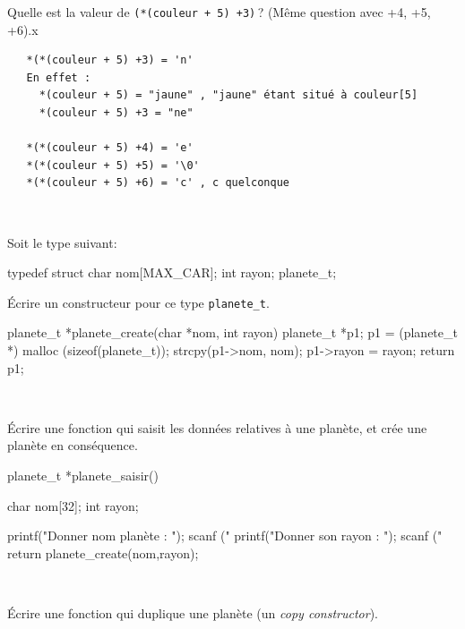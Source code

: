 \documentclass[10pt]{article}\usepackage[nu,correction]{esial}
\begin{document}
\Question Quelle est la valeur de {\tt *(*(couleur + 5) +3)}\,? (Même
question avec +4, +5, +6).x

\begin{Reponse}
\begin{verbatim} 
   *(*(couleur + 5) +3) = 'n' 
   En effet : 
     *(couleur + 5) = "jaune" , "jaune" étant situé à couleur[5] 
     *(couleur + 5) +3 = "ne"

   *(*(couleur + 5) +4) = 'e' 
   *(*(couleur + 5) +5) = '\0' 
   *(*(couleur + 5) +6) = 'c' , c quelconque 
\end{verbatim}
~
\end{Reponse}




\bigskip\bigskip{}

Soit le type suivant:


\medskip

\begin{boxedverbatim}
  typedef struct {
    char nom[MAX_CAR];
    int  rayon;  
  } planete_t;
\end{boxedverbatim}


\Question Écrire un constructeur pour ce type \texttt{planete\_t}.

\begin{Reponse}
  \begin{boxedverbatim} 
planete_t *planete_create(char *nom, int rayon) {
    planete\_t *p1;
    p1 = (planete_t *) malloc (sizeof(planete_t));
    strcpy(p1->nom, nom);
    p1->rayon = rayon;
    return p1;
}  \end{boxedverbatim}
~
\end{Reponse}
	  
\Question Écrire une fonction qui saisit les données relatives à une
planète, et crée une planète en conséquence.

\begin{Reponse}
  \begin{boxedverbatim} 
planete_t *planete_saisir(){
  char nom[32];
  int rayon;

  printf("Donner nom planète : ");
  scanf ("%
  printf("Donner son rayon : ");
  scanf ("%
  return planete_create(nom,rayon);
}  \end{boxedverbatim}
~
\end{Reponse}

\Question Écrire une fonction qui duplique une planète (un
\textit{copy constructor}). 
\end{document}
